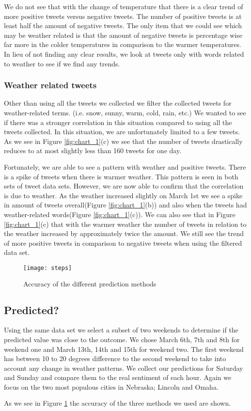 We do not see that with the change of temperature that there is a clear trend of more positive tweets versus negative tweets. The number of positive tweets is at least half the amount of negative tweets. The only item that we could see which may be weather related is that the amount of negative tweets is percentage wise far more in the colder temperatures in comparison to the warmer temperatures. In lieu of not finding any clear results, we look at tweets only with words related to weather to see if we find any trends.



\subsubsection{Weather related tweets}

Other than using all the tweets we collected we filter the collected tweets for weather-related terms. (i.e. snow, sunny, warm, cold, rain, etc.) We wanted to see if there was a stronger correlation in this situation compared to using all the tweets collected. In this situation, we are unfortunately limited to a few tweets. As we see in Figure \ref{fig:chart_1}(c) we see that the number of tweets drastically reduces to at most slightly less than 160 tweets for one day.

Fortunately, we are able to see a pattern with weather and positive tweets. There is a spike of tweets when there is warmer weather. This pattern is seen in both sets of tweet data sets. However, we are now able to confirm that the correlation is due to weather. As the weather increased slightly on March 1st we see a spike in amount of tweets overall(Figure \ref{fig:chart_1}(b)) and also when the tweets had weather-related words(Figure \ref{fig:chart_1}(c)). We can also see that in Figure \ref{fig:chart_1}(c) that with the warmer weather the number of tweets in relation to the weather increased by approximately twice the amount. We still see the trend of more positive tweets in comparison to negative tweets when using the filtered data set.

\begin{figure}[htb]
 \centering
 \texttt{[image: steps]}
 \caption{Accuracy of the different prediction methods}
 \label{fig:predict}
\end{figure}

\subsection{Predicted?}
Using the same data set we select a subset of two weekends to determine if the predicted value was close to the outcome. We chose March 6th, 7th and 8th for weekend one and March 13th, 14th and 15th for weekend two. The first weekend has between 10 to 20 degrees difference to the second weekend to take into account any change in weather patterns. We collect our predictions for Saturday and Sunday and compare them to the real sentiment of each hour. Again we focus on the two most populous cities in Nebraska; Lincoln and Omaha.

As we see in Figure \ref{fig:predict} the accuracy of the three methods we used are shown.

